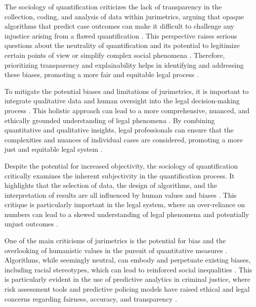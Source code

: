 The sociology of quantification criticizes the lack of transparency in the collection, coding, and analysis of data within jurimetrics, arguing that opaque algorithms that predict case outcomes can make it difficult to challenge any injustice arising from a flawed quantification \cite{10.1590/dados.2022.65.3.267,10.1057/s41599-020-0396-5}. This perspective raises serious questions about the neutrality of quantification and its potential to legitimize certain points of view or simplify complex social phenomena \cite{10.1111/ilr.12067, de2010jurimetrics}. Therefore, prioritizing transparency and explainability helps in identifying and addressing these biases, promoting a more fair and equitable legal process \cite{10.1007/s11186-021-09453-1,1023071190721}.

To mitigate the potential biases and limitations of jurimetrics, it is important to integrate qualitative data and human oversight into the legal decision-making process \cite{10.1590/dados.2022.65.3.267,10.1057/s41599-020-00557-0}. This holistic approach can lead to a more comprehensive, nuanced, and ethically grounded understanding of legal phenomena \cite{10.1590/dados.2022.65.3.267,10.1057/s41599-020-00557-0}. By combining quantitative and qualitative insights, legal professionals can ensure that the complexities and nuances of individual cases are considered, promoting a more just and equitable legal system \cite{10.1590/dados.2022.65.3.267,10.1057/s41599-020-00557-0}.

Despite the potential for increased objectivity, the sociology of quantification critically examines the inherent subjectivity in the quantification process. It highlights that the selection of data, the design of algorithms, and the interpretation of results are all influenced by human values and biases \cite{10.1057/s41599-020-00557-0, de2010jurimetrics}. This critique is particularly important in the legal system, where an over-reliance on numbers can lead to a skewed understanding of legal phenomena and potentially unjust outcomes \cite{10.1057/s41599-020-00557-0, de2010jurimetrics}.

One of the main criticisms of jurimetrics is the potential for bias and the overlooking of humanistic values in the pursuit of quantitative measures \cite{10.1177/09596801221075807, de2010jurimetrics}. Algorithms, while seemingly neutral, can embody and perpetuate existing biases, including racial stereotypes, which can lead to reinforced social inequalities \cite{10.1590/dados.2022.65.3.267,in the lawviewmetadatacitationsimilarpapers2014}. This is particularly evident in the use of predictive analytics in criminal justice, where risk assessment tools and predictive policing models have raised ethical and legal concerns regarding fairness, accuracy, and transparency \cite{10.1515/9781400829699,nayler2010}.

